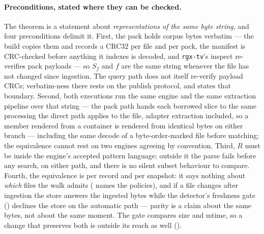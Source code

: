 \documentclass[11pt,letterpaper]{article}
\begin{document}
\paragraph{Preconditions, stated where they can be checked.}
The theorem is a statement about \emph{representations of the same byte
string}, and four preconditions delimit it. First, the pack holds corpus
bytes verbatim --- the build copies them and records a CRC32 per file and
per pack, the manifest is CRC-checked before anything it indexes is
decoded, and \texttt{rgx-tv}'s inspect re-verifies pack payloads --- so
$S_f$ and $f$ are the same string whenever the file has not changed since
ingestion. The query path does not itself re-verify payload CRCs;
verbatim-ness there rests on the publish protocol, and 
states that boundary.
Second, both executions run the same engine and the same extraction
pipeline over that string --- the pack path hands each borrowed slice to the
same processing the direct path applies to the file, adapter extraction
included, so a member rendered from a container is rendered from identical
bytes on either branch --- including the same decode of a byte-order-marked
file before matching; the equivalence cannot rest on two engines agreeing by
convention. Third, $R$
must be inside the engine's accepted pattern language; outside it the parse
fails before any search, on either path, and there is no silent subset
behaviour to compare. Fourth, the equivalence is per record and per
snapshot: it says nothing about \emph{which} files the walk admits
( names the policies), and if a file changes after
ingestion the store answers the ingested bytes while the detector's
freshness gate () declines the store on the automatic
path --- parity
is a claim about the same bytes, not about the same moment. The gate
compares size and mtime, so a change that preserves both is outside its
reach as well ().
\end{document}
